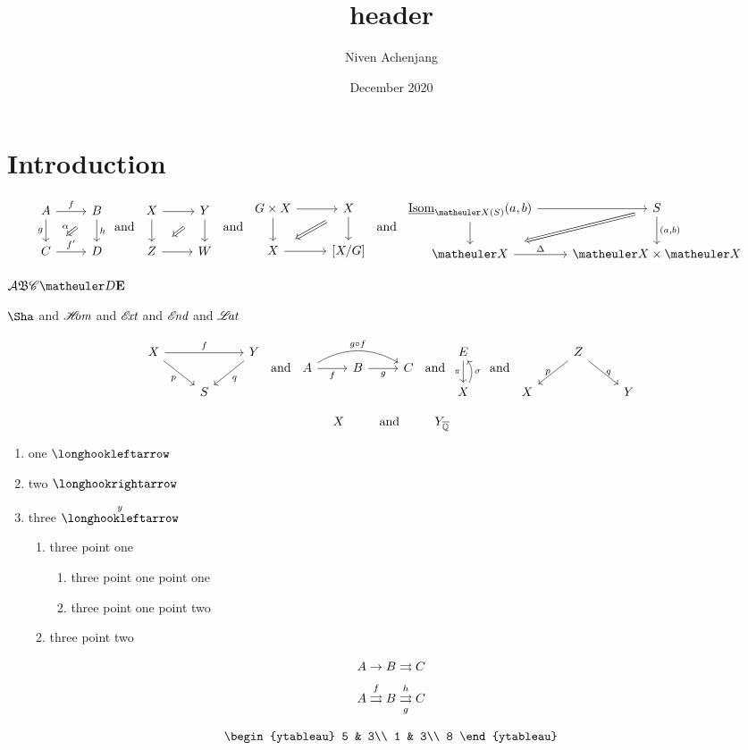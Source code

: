 \documentclass{article}
\title{header}
\author{Niven Achenjang}
\date{December 2020}
\numberwithin{thm}{section}
\numberwithin{prob}{section}
\numberwithin{equation}{section}
\begin{document}
\maketitle

\section{Introduction}

$$\twocommsquare AfBghC{f'}D\alpha\tand\baretwocommsquare XYZW\tand\baretwocommsquare{G\by X}XX{[X/G]}\tand\twocommsquare{\ul\Isom_{\meX(S)}(a,b)}{}S{}{(a,b)}\meX\Delta{\meX\by\meX}{}$$

$\mcA\mf B\msC\meD\mbf E$

$\Sha$ and $\sHom$ and $\sExt$ and $\sEnd$ and $\sLat$

$$\mapover XfYpqS\tand\compdiag AfBgC{g\circ f}\tand\mapwithsect E\pi X\sigma\tand\correspondence ZpqXY$$

$$X\Text{and}\sspacing Y_\Qbar$$

\begin{enumerate}
    \item one $\fintoo$
    \item two $\intoo$
    \item three $\xfintoo{y}$
    \begin{enumerate}
        \item three point one
        \begin{enumerate}
            \item three point one point one
            \item three point one point two
        \end{enumerate}
        \item three point two
    \end{enumerate}
\end{enumerate}
$$A\to B\toto C$$
$$A \xtoto fB \xtoto[g]h C$$

$$\begin{ytableau}
    5 & 3\\
    1 & 3\\
    8
\end{ytableau}$$
\end{document}
